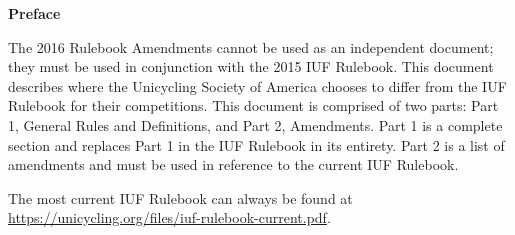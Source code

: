 {\huge \textbf{Preface} \\}
\thispagestyle{plain}


The 2016 Rulebook Amendments cannot be used as an independent document; they must be used in conjunction with the 2015 IUF Rulebook.
This document describes where the Unicycling Society of America chooses to differ from the IUF Rulebook for their competitions.
This document is comprised of two parts: Part 1, General Rules and Definitions, and Part 2, Amendments.
Part 1 is a complete section and replaces Part 1 in the IUF Rulebook in its entirety.
Part 2 is a list of amendments and must be used in reference to the current IUF Rulebook.

The most current IUF Rulebook can always be found at \url{https://unicycling.org/files/iuf-rulebook-current.pdf}.
